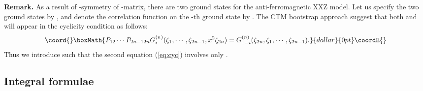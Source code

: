 \documentclass[a4paper,10pt]{article}
\begin{document}
{\bf Remark.} As a result of \coordHE{}-symmetry 
of \coordHE{}-matrix, there are two ground states for 
the anti-ferromagnetic XXZ model. Let us specify the 
two ground states by \coordHE{}, and denote the correlation 
function on the \coordHE{}-th ground state by \coordHE{}. 
The CTM bootstrap approach suggest that both 
\coordHE{} and \coordHE{} will appear 
in the cyclicity condition as follows: 
$$\coord{}\boxMath{
P_{12}\cdots P_{2n-1 2n} G_{i}^{(n)} 
(\zeta_1,\cdots,\zeta_{2n-1}, x^{2}\zeta_{2n})
=G_{1-i}^{(n)} 
(\zeta_{2n}, \zeta_1,\cdots,\zeta_{2n-1}). 
}{dollar}{0pt}\coordE{}$$
Thus we introduce \coordHE{} 
such that the second equation (\ref{eq:cyc}) 
involves only \coordHE{}. 

\subsection{Integral formulae} 
\end{document}

